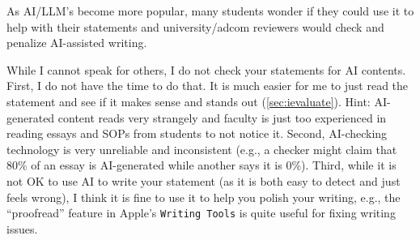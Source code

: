 \documentclass[oneside,11pt,dvipsnames]{book}
\newcommand{\sectioninfo}[1]{%
  \phantomsection
  \addcontentsline{toc}{sectioninfo}{\textcolor{black}{\emph{#1}}}%
}
\begin{document}
As AI/LLM's become more popular, many students wonder if they could use it to help with their statements and university/adcom reviewers would check and penalize AI-assisted writing.

While I cannot speak for others, I do not check your statements for AI contents. First, I do not have the time to do that.  It is much easier for me to just read the statement and see if it makes sense and stands out (\autoref{sec:ievaluate}). Hint: AI-generated content reads very strangely and faculty is just too experienced in reading essays and SOPs from students
to not notice it.
Second, AI-checking technology is very unreliable and inconsistent (e.g., a checker might claim that 80\% of an essay is AI-generated while another says it is 0\%).  Third, while it is not OK to use AI to write your statement (as it is both easy to detect and just feels wrong), I think it is fine to use it to help you polish your writing, e.g., the ``proofread'' feature in Apple's \texttt{Writing Tools} is quite useful for fixing writing issues.  




\end{document}
